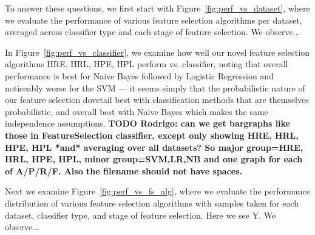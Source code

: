 To answer these questions, we first start with
Figure~\ref{fig:perf_vs_dataset}, where we evaluate the performance of
various feature selection algorithms per dataset, averaged across
classifier type and each stage of feature selection.  We observe...

In Figure~\ref{fig:perf_vs_classifier}, we examine how well our 
novel feature selection algorithms HRE, HRL, HPE, HPL 
perform vs. classifier, noting that overall performance is best
for Naive Bayes followed by Logistic Regression and noticeably worse for
the SVM --- it seems simply that the probabilistic nature of our feature selection
dovetail best with classification methods that are themselves probabilistic,
and overall best with Naive Bayes which makes the same independence assumptions.
{\bf TODO Rodrigo: can we get bargraphs like those in FeatureSelection classifier,
except only showing HRE, HRL, HPE, HPL *and* averaging over all datasets?
So major group={HRE, HRL, HPE, HPL}, minor group={SVM,LR,NB} and one graph
for each of A/P/R/F.  Also the filename should not have spaces.}

Next we examine Figure~\ref{fig:perf_vs_fs_alg}, where we evaluate the
performance distribution of various feature selection algorithms with
samples taken for each dataset, classifier type, and stage of feature
selection.  Here we see Y.  We observe...


